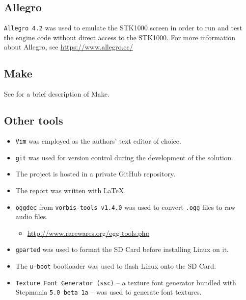 \subsection{Allegro}
	\texttt{Allegro 4.2} was used to emulate the STK1000 screen in order to run and test the engine code without direct access to the STK1000.
	For more information about Allegro, see \url{https://www.allegro.cc/}

\subsection{Make}
	See \cite{tdt4258-1} for a brief description of Make.

\subsection{Other tools}
	\begin{itemize}
		\item{\texttt{Vim} was employed as the authors' text editor of choice.}
		\item{\texttt{git} was used for version control during the development of the solution.}
		\item{The project is hosted in a private GitHub repository.}
		\item{The report was written with \LaTeX.}
		\item{\texttt{oggdec} from \texttt{vorbis-tools v1.4.0} was used to convert \texttt{.ogg} files to raw audio files.}
		\begin{itemize}
				\item{\url{http://www.rarewares.org/ogg-tools.php}}
		\end{itemize}
		\item{\texttt{gparted} was used to format the SD Card before installing Linux on it.}
		\item{The \texttt{u-boot} bootloader was used to flash Linux onto the SD Card.}
		\item{\texttt{Texture Font Generator (ssc)} -- a texture font generator bundled with Stepmania \texttt{5.0 beta 1a} -- was used to generate font textures.}
	\end{itemize}
